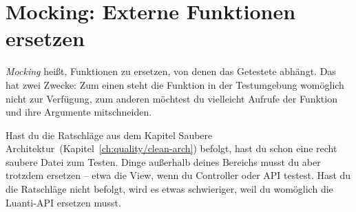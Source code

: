 \section{Mocking: Externe Funktionen
ersetzen}\label{mocking-externe-funktionen-ersetzen}

\emph{Mocking} heißt, Funktionen zu ersetzen, von
denen das Getestete abhängt. Das hat zwei Zwecke: Zum einen steht die
Funktion in der Testumgebung womöglich nicht zur Verfügung, zum anderen
möchtest du vielleicht Aufrufe der Funktion und ihre Argumente
mitschneiden.

Hast du die Ratschläge aus dem Kapitel Saubere
Architektur~(Kapitel~\ref{ch:quality/clean-arch}) befolgt, hast du schon
eine recht saubere Datei zum Testen. Dinge außerhalb deines Bereichs
musst du aber trotzdem ersetzen -- etwa die View, wenn du Controller
oder API testest. Hast du die Ratschläge nicht befolgt, wird es etwas
schwieriger, weil du womöglich die Luanti-API ersetzen musst.


